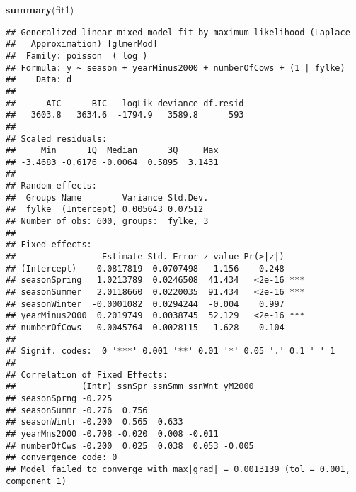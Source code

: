 \documentclass[]{book}
\newenvironment{Shaded}{\begin{snugshade}}{\end{snugshade}}
\newcommand{\KeywordTok}[1]{\textcolor[rgb]{0.13,0.29,0.53}{\textbf{#1}}}
\newcommand{\NormalTok}[1]{#1}
\begin{document}
\begin{Shaded}
\begin{Highlighting}[]
\KeywordTok{summary}\NormalTok{(fit1)}
\end{Highlighting}
\end{Shaded}

\begin{verbatim}
## Generalized linear mixed model fit by maximum likelihood (Laplace
##   Approximation) [glmerMod]
##  Family: poisson  ( log )
## Formula: y ~ season + yearMinus2000 + numberOfCows + (1 | fylke)
##    Data: d
## 
##      AIC      BIC   logLik deviance df.resid 
##   3603.8   3634.6  -1794.9   3589.8      593 
## 
## Scaled residuals: 
##     Min      1Q  Median      3Q     Max 
## -3.4683 -0.6176 -0.0064  0.5895  3.1431 
## 
## Random effects:
##  Groups Name        Variance Std.Dev.
##  fylke  (Intercept) 0.005643 0.07512 
## Number of obs: 600, groups:  fylke, 3
## 
## Fixed effects:
##                 Estimate Std. Error z value Pr(>|z|)    
## (Intercept)    0.0817819  0.0707498   1.156    0.248    
## seasonSpring   1.0213789  0.0246508  41.434   <2e-16 ***
## seasonSummer   2.0118660  0.0220035  91.434   <2e-16 ***
## seasonWinter  -0.0001082  0.0294244  -0.004    0.997    
## yearMinus2000  0.2019749  0.0038745  52.129   <2e-16 ***
## numberOfCows  -0.0045764  0.0028115  -1.628    0.104    
## ---
## Signif. codes:  0 '***' 0.001 '**' 0.01 '*' 0.05 '.' 0.1 ' ' 1
## 
## Correlation of Fixed Effects:
##             (Intr) ssnSpr ssnSmm ssnWnt yM2000
## seasonSprng -0.225                            
## seasonSummr -0.276  0.756                     
## seasonWintr -0.200  0.565  0.633              
## yearMns2000 -0.708 -0.020  0.008 -0.011       
## numberOfCws -0.200  0.025  0.038  0.053 -0.005
## convergence code: 0
## Model failed to converge with max|grad| = 0.0013139 (tol = 0.001, component 1)
\end{verbatim}


\end{document}
